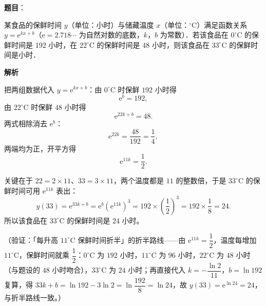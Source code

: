 \begin{answer}

\textbf{题目}：

某食品的保鲜时间 \(y\)（单位：小时）与储藏温度 \(x\)（单位：\(^{\circ}\mathrm{C}\)）满足函数关系 \(y=\mathrm{e}^{kx+b}\)（\(\mathrm{e}=2.718\cdots\) 为自然对数的底数，\(k\)，\(b\) 为常数）．若该食品在 \(0^{\circ}\mathrm{C}\) 的保鲜时间是 192 小时，在 \(22^{\circ}\mathrm{C}\) 的保鲜时间是 48 小时，则该食品在 \(33^{\circ}\mathrm{C}\) 的保鲜时间是\gkblank{}小时．

\textbf{解析}

把两组数据代入 \(y=\mathrm{e}^{kx+b}\)：由 \(0^{\circ}\mathrm{C}\) 时保鲜 \(192\) 小时得
\nopagebreak[4]
\[
\mathrm{e}^{b}=192,
\]
由 \(22^{\circ}\mathrm{C}\) 时保鲜 \(48\) 小时得
\nopagebreak[4]
\[
\mathrm{e}^{22k+b}=48.
\]
两式相除消去 \(\mathrm{e}^{b}\)：
\nopagebreak[4]
\[
\mathrm{e}^{22k}=\dfrac{48}{192}=\dfrac14,
\]
两端均为正，开平方得
\nopagebreak[4]
\[
\mathrm{e}^{11k}=\dfrac12.
\]

关键在于 \(22=2\times11\)、\(33=3\times11\)，两个温度都是 \(11\) 的整数倍，于是 \(33^{\circ}\mathrm{C}\) 的保鲜时间可用 \(\mathrm{e}^{11k}\) 表出：
\nopagebreak[4]
\[
y(33)=\mathrm{e}^{33k+b}=\mathrm{e}^{b}\left(\mathrm{e}^{11k}\right)^{3}=192\times\left(\dfrac12\right)^{3}=192\times\dfrac18=24.
\]
所以该食品在 \(33^{\circ}\mathrm{C}\) 的保鲜时间是 \(24\) 小时。

（验证：「每升高 \(11^{\circ}\mathrm{C}\) 保鲜时间折半」的折半路线——由 \(\mathrm{e}^{11k}=\dfrac12\)，温度每增加 \(11^{\circ}\mathrm{C}\)，保鲜时间就乘 \(\dfrac12\)：\(0^{\circ}\mathrm{C}\) 为 \(192\) 小时，\(11^{\circ}\mathrm{C}\) 为 \(96\) 小时，\(22^{\circ}\mathrm{C}\) 为 \(48\) 小时（与题设的 \(48\) 小时吻合），\(33^{\circ}\mathrm{C}\) 为 \(24\) 小时；再直接代入 \(k=-\dfrac{\ln2}{11}\)，\(b=\ln192\) 复算，得 \(33k+b=\ln192-3\ln2=\ln\dfrac{192}{8}=\ln24\)，故 \(y(33)=\mathrm{e}^{\ln24}=24\)，与折半路线一致。）


\end{answer}
